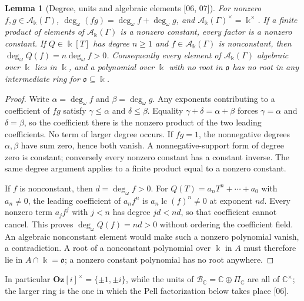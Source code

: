 \documentclass[11pt,oneside]{article}
\numberwithin{equation}{section}
\newtheorem{lemma}[lemma]{Lemma}
\theoremstyle{definition}
\theoremstyle{remark}
\newcommand{\Oz}{\mathbf{Oz}}
\newcommand{\C}{\mathbb C}
\newcommand{\BC}{\mathcal B_{\C}}
\newcommand{\lc}{\operatorname{lc}}
\newcommand{\ddeg}{\operatorname{deg}_{\omega}}
\newcommand{\src}[1]{\textup{\textsf{\small[#1]}}}
\newcommand{\Og}{\Oz[i]}
\begin{document}
\begin{lemma}[Degree, units and algebraic elements \src{06, 07}]\label{odg:def:lem:units}
For nonzero $f,g\in\mathcal A_\Bbbk(\Gamma)$,
$\ddeg(fg)=\ddeg f+\ddeg g$, and $\mathcal A_\Bbbk(\Gamma)^\times=\Bbbk^\times$.
If a finite product of elements of $\mathcal A_\Bbbk(\Gamma)$ is a nonzero
constant, every factor is a nonzero constant. If $Q\in\Bbbk[T]$ has degree
$n\ge1$ and $f\in\mathcal A_\Bbbk(\Gamma)$ is nonconstant, then
$\ddeg Q(f)=n\ddeg f>0$. Consequently every element of
$\mathcal A_\Bbbk(\Gamma)$ algebraic over $\Bbbk$ lies in $\Bbbk$, and a
polynomial over $\Bbbk$ with no root in $\mathfrak o$ has no root in any
intermediate ring for $\mathfrak o\subseteq\Bbbk$.
\end{lemma}
\begin{proof}
Write $\alpha=\ddeg f$ and $\beta=\ddeg g$. Any exponents contributing to
a coefficient of $fg$ satisfy $\gamma\le\alpha$ and $\delta\le\beta$.
Equality $\gamma+\delta=\alpha+\beta$ forces $\gamma=\alpha$ and
$\delta=\beta$, so the coefficient there is the nonzero product of the two
leading coefficients. No term of larger degree occurs. If $fg=1$, the
nonnegative degrees $\alpha,\beta$ have sum zero, hence both vanish. A
nonnegative-support form of degree zero is constant; conversely every
nonzero constant has a constant inverse. The same degree argument applies
to a finite product equal to a nonzero constant.

If $f$ is nonconstant, then $d=\ddeg f>0$. For
$Q(T)=a_nT^n+\cdots+a_0$ with $a_n\ne0$, the leading coefficient of $a_nf^n$
is $a_n\lc(f)^n\ne0$ at exponent $nd$. Every nonzero term $a_jf^j$ with
$j<n$ has degree $jd<nd$, so that coefficient cannot cancel. This proves
$\ddeg Q(f)=nd>0$ without ordering the coefficient field. An algebraic
nonconstant element would make such a nonzero polynomial vanish, a
contradiction. A root of a nonconstant polynomial over $\Bbbk$ in $A$ must
therefore lie in $A\cap\Bbbk=\mathfrak o$; a nonzero constant polynomial has
no root anywhere.
\end{proof}

In particular $\Og^\times=\{\pm1,\pm i\}$, while the units of
$\BC=\C\oplus\Pi_{\C}$ are all of $\C^\times$; the larger ring is the one in
which the Pell factorization below takes place \src{06}.
\end{document}
